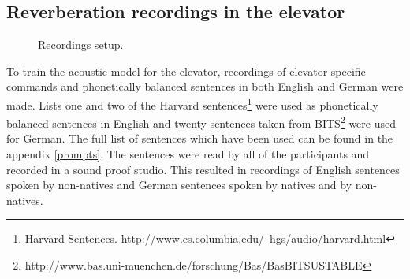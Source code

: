 \documentclass[a4paper, 12pt]{article}
\begin{document}
\subsection{Reverberation recordings in the elevator}

\begin{figure}
\caption{Recordings setup.}
\label{fig:recordingsetup}
\end{figure}


To train the acoustic model for the elevator, recordings of elevator-specific commands and phonetically balanced sentences in both English and German were made.
Lists one and two  of the Harvard sentences\footnote{Harvard Sentences. http://www.cs.columbia.edu/~hgs/audio/harvard.html} were used as phonetically balanced sentences in English and twenty sentences taken from BITS\footnote{http://www.bas.uni-muenchen.de/forschung/Bas/BasBITSUSTABLE} were used for German.
The full list of sentences which have been used can be found in the appendix \ref{prompts}.
The sentences were read by all of the participants and recorded in a sound proof studio.
This resulted in recordings of English sentences spoken by non-natives and German sentences spoken by natives and by non-natives.
\end{document}
